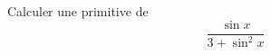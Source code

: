 Calculer une primitive de 
\begin{displaymath}
 \frac{\sin x}{3+\sin^2x}
\end{displaymath}
\bigskip \bigskip